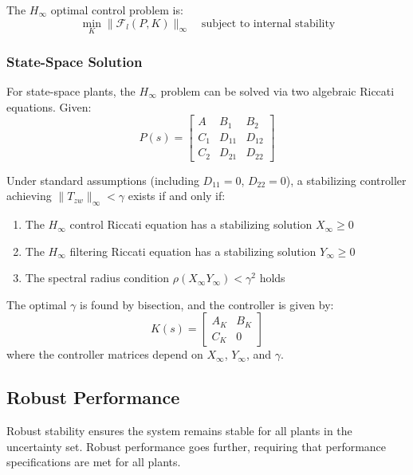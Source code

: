 The $H_\infty$ optimal control problem is:
\begin{equation}
\min_K \| \mathcal{F}_l(P, K) \|_\infty \quad \text{subject to internal stability}
\end{equation}

\subsubsection{State-Space Solution}

For state-space plants, the $H_\infty$ problem can be solved via two algebraic Riccati equations. Given:
\begin{equation}
P(s) = \begin{bmatrix} A & B_1 & B_2 \\ \hline C_1 & D_{11} & D_{12} \\ C_2 & D_{21} & D_{22} \end{bmatrix}
\end{equation}

Under standard assumptions (including $D_{11} = 0$, $D_{22} = 0$), a stabilizing controller achieving $\|T_{zw}\|_\infty < \gamma$ exists if and only if:
\begin{enumerate}
    \item The $H_\infty$ control Riccati equation has a stabilizing solution $X_\infty \geq 0$
    \item The $H_\infty$ filtering Riccati equation has a stabilizing solution $Y_\infty \geq 0$
    \item The spectral radius condition $\rho(X_\infty Y_\infty) < \gamma^2$ holds
\end{enumerate}

The optimal $\gamma$ is found by bisection, and the controller is given by:
\begin{equation}
K(s) = \begin{bmatrix} A_K & B_K \\ \hline C_K & 0 \end{bmatrix}
\end{equation}
where the controller matrices depend on $X_\infty$, $Y_\infty$, and $\gamma$.

\subsection{Robust Performance}
\label{subsec:robust_perf}

Robust stability ensures the system remains stable for all plants in the uncertainty set. Robust performance goes further, requiring that performance specifications are met for all plants.

